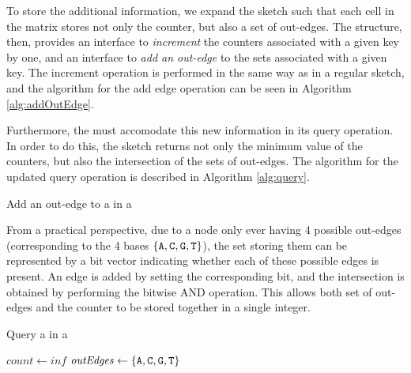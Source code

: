 To store the additional information, we expand the \cm sketch such that each cell in the matrix stores not only the counter,
but also a set of out-edges. The structure, then, provides an interface to \emph{increment} the counters associated with a given key by one,
and an interface to \emph{add an out-edge} to the sets associated with a given key. The increment operation is performed in the same way as in
a regular \cm sketch, and the algorithm for the add edge operation can be seen in Algorithm \ref{alg:addOutEdge}.

Furthermore, the \dBCM must accomodate this new information in its query operation. In order to do this, the sketch returns not only
the minimum value of the counters, but also the intersection of the sets of out-edges. The algorithm for the updated query operation is
described in Algorithm \ref{alg:query}.

\begin{algorithm}[htbp]
    \caption{Add an out-edge to a \kmer in a \dBCM}\label{alg:addOutEdge}
\end{algorithm}

From a practical perspective, due to a node only ever having 4 possible out-edges (corresponding to the 4 bases $\{\mathtt{A}, \mathtt{C}, \mathtt{G}, \mathtt{T}\}$),
the set storing them can be represented by a bit vector indicating whether each of these possible edges is present. An edge is added
by setting the corresponding bit, and the intersection is obtained by performing the bitwise AND operation. This allows both set of
out-edges and the counter to be stored together in a single integer.  

\begin{algorithm}
    \caption{Query a \kmer in a \dBCM}\label{alg:query}
    $\mathit{count} \gets \mathit{inf}$\;
    $\mathit{outEdges} \gets \{\mathtt{A}, \mathtt{C}, \mathtt{G}, \mathtt{T}\}$\;
\end{algorithm}

